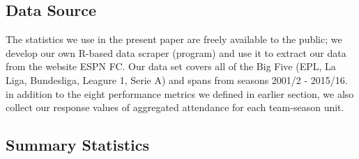 \documentclass[inte,nonblindrev]{informs3} %
\begin{document}
\subsection*{Data Source}
The statistics we use in the present paper are freely available to the public; we develop our own R-based data scraper (program) and use it to extract our data from the website ESPN FC. Our data set covers all of the Big Five (EPL, La Liga, Bundesliga, Leagure 1, Serie A) and spans from seasons 2001/2 - 2015/16. in addition to the eight performance metrics we defined in earlier section, we also collect our response values of aggregated attendance for each team-season unit.   
\subsection*{Summary Statistics}
\end{document}
